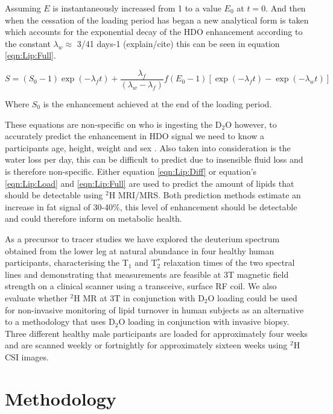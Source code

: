 \documentclass[class=article, crop=false]{standalone}
\begin{document}
Assuming $E$ is instantaneously increased from 1 to a value $E_0$ at $t=0$. And then when the cessation of the loading period has began a new analytical form is taken which accounts for the exponential decay of the HDO enhancement according to the constant $\lambda_w \approx$ 3/41 days-1 (explain/cite) this can be seen in equation \ref{eqn:Lip:Full}.

\begin{equation}
    S = (S_0 - 1)\exp(-\lambda_ft)+\frac{\lambda_f}{(\lambda_w - \lambda_f)}f(E_0 - 1)[\exp(-\lambda_ft)-\exp(-\lambda_wt)]
    \label{eqn:Lip:Full}
\end{equation}

Where $S_0$ is the enhancement achieved at the end of the loading period.

These equations are non-specific on who is ingesting the D$_2$O however, to accurately predict the enhancement in HDO signal we need to know a participants age, height, weight and sex \cite{Watson1980TotalMeasurements}. Also taken into consideration is the water loss per day, this can be difficult to predict due to insensible fluid loss and is therefore non-specific. Either equation \ref{eqn:Lip:Diff} or equation’s \ref{eqn:Lip:Load} and \ref{eqn:Lip:Full} are used to predict the amount of lipids that should be detectable using $^2$H MRI/MRS. Both prediction methods estimate an increase in fat signal of 30-40\%, this level of enhancement should be detectable and could therefore inform on metabolic health. 

As a precursor to tracer studies we have explored the deuterium spectrum obtained from the lower leg at natural abundance in four healthy human participants, characterising the T$_1$ and T$_2^*$ relaxation times of the two spectral lines and demonstrating that measurements are feasible at 3T magnetic field strength on a clinical scanner using a transceive, surface RF coil. We also evaluate whether $^2$H MR at 3T in conjunction with D$_2$O loading could be used for non-invasive monitoring of lipid turnover in human subjects as an alternative to a methodology that uses D$_2$O loading in conjunction with invasive biopsy. Three different healthy male participants are loaded for approximately four weeks and are scanned weekly or fortnightly for approximately sixteen weeks using $^2$H CSI images.

\section{Methodology}
\end{document}
